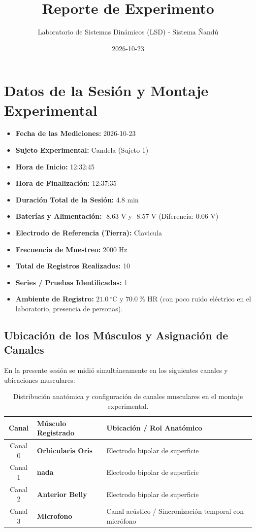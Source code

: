 \documentclass[11pt,a4paper]{article}
\title{\textbf{Reporte de Experimento}}
\author{Laboratorio de Sistemas Dinámicos (LSD) - Sistema Ñandú}
\date{2026-10-23}
\begin{document}
\maketitle

\section{Datos de la Sesión y Montaje Experimental}
\begin{itemize}
    \item \textbf{Fecha de las Mediciones:} 2026-10-23
    \item \textbf{Sujeto Experimental:} Candela (Sujeto 1)
    \item \textbf{Hora de Inicio:} 12:32:45
    \item \textbf{Hora de Finalización:} 12:37:35
    \item \textbf{Duración Total de la Sesión:} 4.8 min
    \item \textbf{Baterías y Alimentación:} -8.63 V y -8.57 V (Diferencia: 0.06 V)
    \item \textbf{Electrodo de Referencia (Tierra):} Clavicula
    \item \textbf{Frecuencia de Muestreo:} 2000 Hz
    \item \textbf{Total de Registros Realizados:} 10
    \item \textbf{Series / Pruebas Identificadas:} 1
    \item \textbf{Ambiente de Registro:} $21.0\ ^\circ\text{C}$ y $70.0\ \%\text{ HR}$ (con poco ruido eléctrico en el laboratorio, presencia de personas).
\end{itemize}

\subsection{Ubicación de los Músculos y Asignación de Canales}
En la presente sesión se midió simultáneamente en los siguientes canales y ubicaciones musculares:
\begin{table}[H]
\centering
\begin{tabularx}{\textwidth}{c p{6.5cm} X}
\toprule
\textbf{Canal} & \textbf{Músculo Registrado} & \textbf{Ubicación / Rol Anatómico} \\
\midrule
Canal 0 & \textbf{Orbicularis Oris} & Electrodo bipolar de superficie \\
Canal 1 & \textbf{nada} & Electrodo bipolar de superficie \\
Canal 2 & \textbf{Anterior Belly} & Electrodo bipolar de superficie \\
Canal 3 & \textbf{Microfono} & Canal acústico / Sincronización temporal con micrófono \\
\bottomrule
\end{tabularx}
\caption{Distribución anatómica y configuración de canales musculares en el montaje experimental.}
\end{table}
\end{document}
